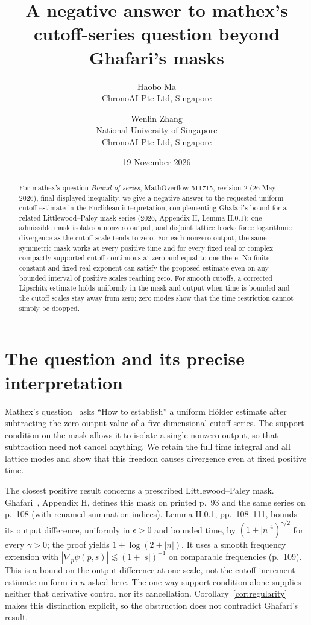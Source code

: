 \documentclass[11pt]{article}
\title{A negative answer to mathex's cutoff-series question beyond Ghafari's masks}
\author{Haobo Ma\\\small ChronoAI Pte Ltd, Singapore
\and Wenlin Zhang\\\small National University of Singapore\\\small ChronoAI Pte Ltd, Singapore}
\date{19 November 2026}
\begin{document}
\maketitle
\begin{abstract}
For mathex's question \emph{Bound of series}, MathOverflow 511715,
revision 2 (26 May 2026), final displayed inequality, we give a negative answer to the requested
uniform cutoff estimate in the Euclidean interpretation, complementing
Ghafari's bound for a related Littlewood--Paley-mask series
(2026, Appendix H, Lemma H.0.1): one admissible
mask isolates a nonzero output, and disjoint lattice blocks force
logarithmic divergence as the cutoff scale tends to zero.
For each nonzero output, the same symmetric mask works at every positive
time and for every fixed real or complex compactly supported cutoff
continuous at zero and equal to one there. No finite constant and fixed real
exponent can satisfy the proposed estimate even on any bounded interval
of positive scales reaching zero.
For smooth cutoffs, a corrected Lipschitz estimate holds uniformly in the
mask and output when time is bounded and the cutoff scales stay away from zero;
zero modes show that the time restriction cannot simply be dropped.
\end{abstract}

\section{The question and its precise interpretation}

Mathex's question~\cite{mathex} asks ``How to establish'' a uniform
H\"older estimate after subtracting the zero-output value of a
five-dimensional cutoff series.
The support condition on the mask allows it to isolate a single nonzero
output, so that subtraction need not cancel anything. We retain the full
time integral and all lattice modes and show that this freedom causes
divergence even at fixed positive time.

The closest positive result concerns a prescribed Littlewood--Paley mask.
Ghafari~\cite{ghafari}, Appendix H, defines this mask on printed p.~93
and the same series on p.~108 (with renamed summation indices).
Lemma H.0.1, pp.~108--111, bounds its output difference, uniformly in
$\epsilon>0$ and bounded time, by
$(1+|n|^4)^{\gamma/2}$ for every $\gamma>0$; the proof yields
$1+\log(2+|n|)$. It uses a smooth frequency extension with
$|\nabla_p\psi(p,s)|\lesssim(1+|s|)^{-1}$ on comparable frequencies
(p.~109). This is a bound on the output difference at one scale, not
the cutoff-increment estimate uniform in $n$ asked here.
The one-way support condition alone supplies neither that derivative
control nor its cancellation. Corollary~\ref{cor:regularity} makes
this distinction explicit, so the obstruction does not contradict
Ghafari's result.
\end{document}

